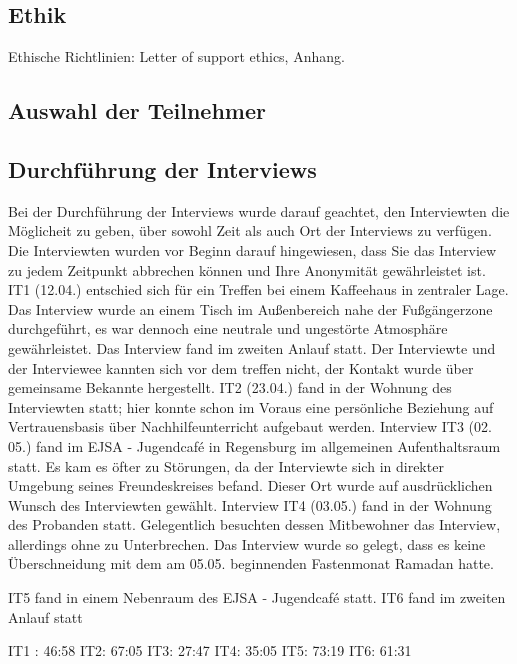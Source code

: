 \subsection{Ethik}
Ethische Richtlinien: Letter of support ethics, Anhang.

\subsection{Auswahl der Teilnehmer}

\subsection{Durchführung der Interviews}

Bei der Durchführung der Interviews wurde darauf geachtet, den Interviewten die Möglicheit zu geben, über sowohl Zeit als auch Ort der Interviews zu verfügen. Die Interviewten wurden vor Beginn darauf hingewiesen, dass Sie das Interview zu jedem Zeitpunkt abbrechen können und Ihre Anonymität gewährleistet ist.\newline
IT1 (12.04.) entschied sich für ein Treffen bei einem Kaffeehaus in zentraler Lage. Das Interview wurde an einem Tisch im Außenbereich nahe der Fußgängerzone durchgeführt, es war dennoch eine neutrale und ungestörte Atmosphäre gewährleistet. Das Interview fand im zweiten Anlauf statt. Der Interviewte und der Interviewee kannten sich vor dem treffen nicht, der Kontakt wurde über gemeinsame Bekannte hergestellt.\newline
IT2 (23.04.) fand in der Wohnung des Interviewten statt; hier konnte schon im Voraus eine persönliche Beziehung auf Vertrauensbasis über Nachhilfeunterricht aufgebaut werden.
Interview IT3 (02. 05.) fand im EJSA - Jugendcafé in Regensburg im allgemeinen Aufenthaltsraum statt. Es kam es öfter zu Störungen, da der Interviewte sich in direkter Umgebung seines Freundeskreises befand. Dieser Ort wurde auf ausdrücklichen Wunsch des Interviewten gewählt.\newline
Interview IT4 (03.05.) fand in der Wohnung des Probanden statt. Gelegentlich besuchten dessen Mitbewohner das Interview, allerdings ohne zu Unterbrechen. Das Interview wurde so gelegt, dass es keine Überschneidung mit dem am 05.05. beginnenden Fastenmonat Ramadan hatte.\newline

IT5 fand in einem Nebenraum des EJSA - Jugendcafé statt.
IT6 fand im zweiten Anlauf statt

IT1 :	46:58
IT2: 	67:05
IT3:	27:47
IT4:	35:05
IT5:	73:19
IT6: 	61:31

